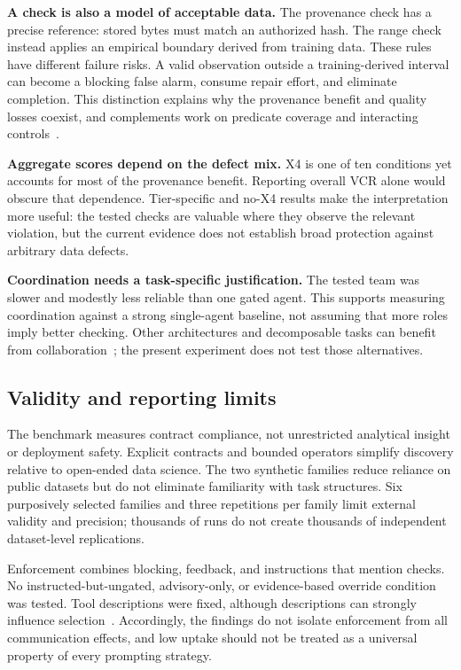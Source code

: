 \documentclass[conference]{IEEEtran}
\begin{document}
\textbf{A check is also a model of acceptable data.} The provenance check has a precise reference: stored bytes must match an authorized hash. The range check instead applies an empirical boundary derived from training data. These rules have different failure risks. A valid observation outside a training-derived interval can become a blocking false alarm, consume repair effort, and eliminate completion. This distinction explains why the provenance benefit and quality losses coexist, and complements work on predicate coverage and interacting controls~\cite{besanson2026sarcdq,besanson2026onegate}.

\textbf{Aggregate scores depend on the defect mix.} X4 is one of ten conditions yet accounts for most of the provenance benefit. Reporting overall VCR alone would obscure that dependence. Tier-specific and no-X4 results make the interpretation more useful: the tested checks are valuable where they observe the relevant violation, but the current evidence does not establish broad protection against arbitrary data defects.

\textbf{Coordination needs a task-specific justification.} The tested team was slower and modestly less reliable than one gated agent. This supports measuring coordination against a strong single-agent baseline, not assuming that more roles imply better checking. Other architectures and decomposable tasks can benefit from collaboration~\cite{fu2026moreagents,kim2025scaling}; the present experiment does not test those alternatives.

\subsection{Validity and reporting limits}
The benchmark measures contract compliance, not unrestricted analytical insight or deployment safety. Explicit contracts and bounded operators simplify discovery relative to open-ended data science. The two synthetic families reduce reliance on public datasets but do not eliminate familiarity with task structures. Six purposively selected families and three repetitions per family limit external validity and precision; thousands of runs do not create thousands of independent dataset-level replications.

Enforcement combines blocking, feedback, and instructions that mention checks. No instructed-but-ungated, advisory-only, or evidence-based override condition was tested. Tool descriptions were fixed, although descriptions can strongly influence selection~\cite{faghih2025toolprefs}. Accordingly, the findings do not isolate enforcement from all communication effects, and low uptake should not be treated as a universal property of every prompting strategy.
\end{document}

